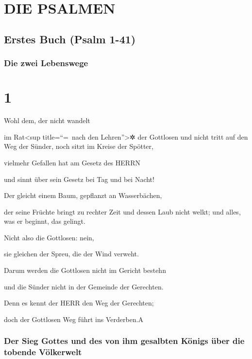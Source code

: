 \hypertarget{die-psalmen}{%
\section{DIE PSALMEN}\label{die-psalmen}}

\hypertarget{erstes-buch-psalm-1-41}{%
\subsection{Erstes Buch (Psalm 1-41)}\label{erstes-buch-psalm-1-41}}

\hypertarget{die-zwei-lebenswege}{%
\subsubsection{Die zwei Lebenswege}\label{die-zwei-lebenswege}}

\hypertarget{section}{%
\section{1}\label{section}}

Wohl dem, der nicht wandelt

im Rat\textless sup title=``=~nach den Lehren''\textgreater✲ der
Gottlosen und nicht tritt auf den Weg der Sünder, noch sitzt im Kreise
der Spötter,

vielmehr Gefallen hat am Gesetz des HERRN

und sinnt über sein Gesetz bei Tag und bei Nacht!

Der gleicht einem Baum, gepflanzt an Wasserbächen,

der seine Früchte bringt zu rechter Zeit und dessen Laub nicht welkt;
und alles, was er beginnt, das gelingt.

Nicht also die Gottlosen: nein,

sie gleichen der Spreu, die der Wind verweht.

Darum werden die Gottlosen nicht im Gericht bestehn

und die Sünder nicht in der Gemeinde der Gerechten.

Denn es kennt der HERR den Weg der Gerechten;

doch der Gottlosen Weg führt ins Verderben.{A}

\hypertarget{der-sieg-gottes-und-des-von-ihm-gesalbten-kuxf6nigs-uxfcber-die-tobende-vuxf6lkerwelt}{%
\subsubsection{Der Sieg Gottes und des von ihm gesalbten Königs über die
tobende
Völkerwelt}\label{der-sieg-gottes-und-des-von-ihm-gesalbten-kuxf6nigs-uxfcber-die-tobende-vuxf6lkerwelt}}

